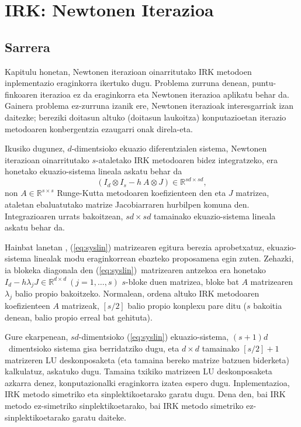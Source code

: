 \chapter{IRK: Newtonen Iterazioa}
\label{chap:IRK-NEW}

\section{Sarrera}


Kapitulu honetan, Newtonen iterazioan oinarritutako IRK metodoen inplementazio eraginkorra ikertuko dugu.
Problema zurruna denean, puntu-finkoaren iterazioa ez da eraginkorra eta Newtonen iterazioa aplikatu behar da. Gainera problema ez-zurruna izanik ere, Newtonen iterazioak interesgarriak izan daitezke; bereziki doitasun altuko (doitasun laukoitza) konputazioetan iterazio metodoaren konbergentzia ezaugarri onak direla-eta. 

Ikusiko dugunez, $d$-dimentsioko ekuazio diferentzialen sistema, Newtonen iterazioan oinarritutako $s$-ataletako IRK metodoaren bidez integratzeko, era honetako ekuazio-sistema lineala askatu behar da
\begin{equation}
\label{eq:syslin}
(I_d \otimes I_s- h \ A \otimes J) \in \mathbb{R}^{sd \times sd},
\end{equation} 
non $A \in \mathbb{R}^{s \times s}$ Runge-Kutta metodoaren koefizienteen den eta $J$ matrizea, ataletan ebaluatutako matrize Jacobiarraren  hurbilpen komuna den. Integrazioaren urrats bakoitzean, $sd \times sd$ tamainako ekuazio-sistema lineala askatu behar da.

Hainbat lanetan \cite{Butcher1976,Liniger1970,Bickart1977}, (\ref{eq:syslin}) matrizearen egitura berezia aprobetxatuz, ekuazio-sistema linealak modu eraginkorrean ebazteko proposamena egin zuten. Zehazki, ia blokeka diagonala den (\ref{eq:syslin})~matrizearen antzekoa era honetako $I_d-h \lambda_j J \in \mathbb{R}^{d \times d} \ (j=1,\dots,s)$ $s$-bloke duen matrizea, bloke bat $A$ matrizearen $\lambda_j$ balio propio  bakoitzeko. Normalean, ordena altuko IRK metodoaren koefizienteen $A$ matrizeak, $[s/2]$ balio propio konplexu pare ditu ($s$ bakoitia denean, balio propio erreal bat gehituta).

Gure ekarpenean, $sd$-dimentsioko (\ref{eq:syslin}) ekuazio-sistema, $(s+1)d$~dimentsioko sistema gisa 
berridatziko dugu, eta $d \times d$ tamainako $[s/2]+1$ matrizeren LU deskonposaketa (eta tamaina bereko matrize batzuen biderketa) kalkulatuz, askatuko dugu. Tamaina txikiko matrizeen LU deskonposaketa azkarra denez, konputazionalki eraginkorra izatea espero dugu. Inplementazioa, IRK metodo simetriko eta sinplektikoetarako garatu dugu. Dena den, bai IRK metodo ez-simetriko sinplektikoetarako, bai IRK metodo simetriko ez-sinplektikoetarako garatu daiteke.
 
